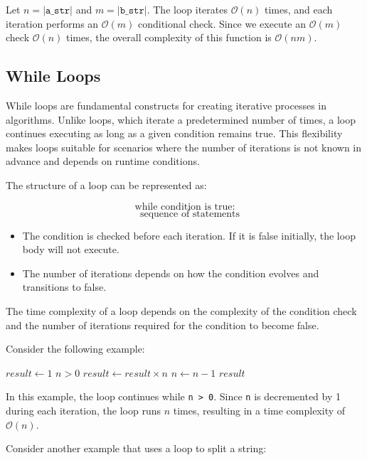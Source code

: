 Let $n = |\texttt{a\_str}|$ and $m = |\texttt{b\_str}|$. The \texttt{\For} loop iterates $\mathcal{O}(n)$ times, and each iteration performs an $\mathcal{O}(m)$ conditional check. Since we execute an $\mathcal{O}(m)$ check $\mathcal{O}(n)$ times, the overall complexity of this function is $\mathcal{O}(nm)$.

\subsection*{While Loops}

While loops are fundamental constructs for creating iterative processes in algorithms. Unlike \texttt{\For} loops, which iterate a predetermined number of times, a \texttt{\While} loop continues executing as long as a given condition remains true. This flexibility makes \texttt{\While} loops suitable for scenarios where the number of iterations is not known in advance and depends on runtime conditions.

The structure of a \texttt{\While} loop can be represented as:

\[
\text{while condition is true:}
\]
\[
\quad \text{sequence of statements}
\]

\begin{itemize}
    \item The condition is checked before each iteration. If it is false initially, the loop body will not execute.
    \item The number of iterations depends on how the condition evolves and transitions to false.
\end{itemize}

The time complexity of a \texttt{\While} loop depends on the complexity of the condition check and the number of iterations required for the condition to become false.

Consider the following example:

\begin{codebox}
    \li $result \gets 1$
    \li \While $n > 0$ \Do
    \li     $result \gets result \times n$
    \li     $n \gets n - 1$
        \End
    \li \Return $result$
\end{codebox}

In this example, the loop continues while \texttt{n > 0}. Since \texttt{n} is decremented by 1 during each iteration, the loop runs $n$ times, resulting in a time complexity of $\mathcal{O}(n)$.

Consider another example that uses a \texttt{\While} loop to split a string:

